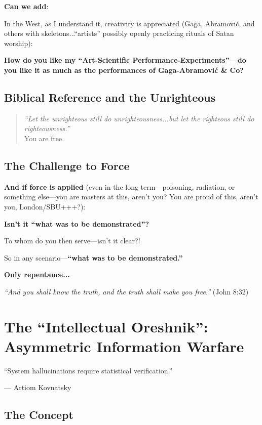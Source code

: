 \documentclass[11pt,a4paper]{article}
\theoremstyle{definition}
\theoremstyle{remark}
\begin{document}
\textbf{Can we add}:

In the West, as I understand it, creativity is appreciated (Gaga, Abramović, and others with skeletons...``artists'' possibly openly practicing rituals of Satan worship):

\textbf{How do you like my ``Art-Scientific Performance-Experiments''—do you like it as much as the performances of Gaga-Abramović \& Co?}

\subsection{Biblical Reference and the Unrighteous}

\begin{quote}
\textit{``Let the unrighteous still do unrighteousness...but let the righteous still do righteousness.''} \\
You are free.
\end{quote}

\subsection{The Challenge to Force}

\textbf{And if force is applied} (even in the long term—poisoning, radiation, or something else—you are masters at this, aren't you? You are proud of this, aren't you, London/SBU+++?):

\textbf{Isn't it ``what was to be demonstrated''?}

To whom do you then serve—isn't it clear?!

So in any scenario—\textbf{``what was to be demonstrated.''}

\textbf{Only repentance...}

\begin{center}
\textit{``And you shall know the truth, and the truth shall make you free.''} (John 8:32)
\end{center}



\section{The ``Intellectual Oreshnik'': Asymmetric Information Warfare}
\label{sec:intellectual_oreshnik}

\epigraph{``System hallucinations require statistical verification.''}{--- Artiom Kovnatsky}

\subsection{The Concept}
\end{document}
